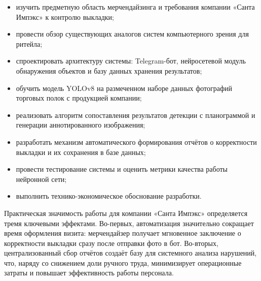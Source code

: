 \begin{itemize}[leftmargin=2.15cm, labelwidth=0.65cm, labelsep=0.0cm]
    \item[•] изучить предметную область мерчендайзинга и требования компании
          «Санта Импэкс» к контролю выкладки;
    \item[•] провести обзор существующих аналогов систем компьютерного зрения
          для ритейла;
    \item[•] спроектировать архитектуру системы: Telegram-бот, нейросетевой
          модуль обнаружения объектов и базу данных хранения результатов;
    \item[•] обучить модель YOLOv8 на размеченном наборе данных фотографий
          торговых полок с продукцией компании;
    \item[•] реализовать алгоритм сопоставления результатов детекции с
          планограммой и генерации аннотированного изображения;
    \item[•] разработать механизм автоматического формирования отчётов о
          корректности выкладки и их сохранения в базе данных;
    \item[•] провести тестирование системы и оценить метрики качества
          работы нейронной сети;
    \item[•] выполнить технико-экономическое обоснование разработки.
\end{itemize}

\redline\gostFont
Практическая значимость работы для компании «Санта Импэкс» определяется тремя ключевыми эффектами.
Во-первых, автоматизация значительно сокращает время оформления визита: мерчендайзер получает мгновенное заключение о корректности выкладки сразу после отправки фото в бот.
Во-вторых, централизованный сбор отчётов создаёт базу для системного анализа нарушений, что, наряду со снижением доли ручного труда, минимизирует операционные затраты и повышает эффективность работы персонала.
